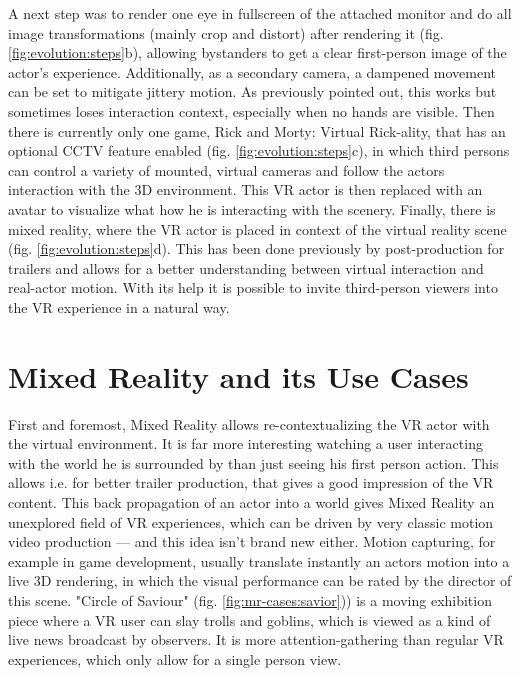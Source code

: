 A next step was to render one eye in fullscreen of the attached monitor and do 
all image transformations (mainly crop and distort) after rendering it (fig. 
\ref{fig:evolution:steps}b), allowing bystanders to get a clear first-person 
image of the actor's experience. Additionally, as a secondary camera, a 
dampened movement can be set to mitigate jittery motion. As previously pointed 
out, this works but sometimes loses interaction context, especially when no 
hands are visible. 
\newline
Then there is currently only one game, Rick and Morty: Virtual Rick-ality, that 
has an optional CCTV feature enabled (fig. \ref{fig:evolution:steps}c), in 
which third persons can control a variety of mounted, virtual cameras and 
follow the actors interaction with the 3D environment. This VR actor is then 
replaced with an avatar to visualize what how he is interacting with the 
scenery.
\newline
Finally, there is mixed reality, where the VR actor is placed in context of 
the virtual reality scene (fig. \ref{fig:evolution:steps}d). This has been done 
previously by post-production for trailers and allows for a better 
understanding between virtual interaction and real-actor motion. With its help 
it is possible to invite third-person viewers into the VR experience in a 
natural way.

\section{Mixed Reality and its Use Cases}

First and foremost, Mixed Reality allows re-contextualizing the VR actor with 
the virtual environment. It is far more interesting watching a user interacting 
with the world he is surrounded by than just seeing his first person action. 
This allows i.e. for better trailer production, that gives a good impression of 
the VR content.
\newline
This back propagation of an actor into a world gives Mixed Reality an 
unexplored field of VR experiences, which can be driven by very classic motion 
video production --- and this idea isn't brand new either. Motion capturing, 
for example in game development, usually translate instantly an actors motion 
into a live 3D rendering, in which the visual performance can be rated by the 
director of this scene.
\newline
"Circle of Saviour" (fig. \ref{fig:mr-cases:savior})) is a moving exhibition 
piece where a VR user can slay trolls and goblins, which is viewed as a kind of 
live news broadcast by observers. It is more attention-gathering than regular 
VR experiences, which only allow for a single person view. 

